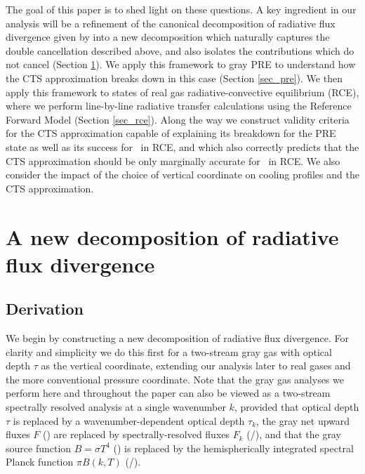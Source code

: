 \documentclass[10pt]{article}
\newcommand{\tauk}{\ensuremath{\tau_k}}
\begin{document}
The goal of this paper is to shed light on these questions.   A key ingredient in our analysis will be a refinement of the canonical decomposition of radiative flux divergence given by \cite{green1967} into a new decomposition which naturally captures the  double cancellation described above, and also isolates the contributions which do not cancel (Section \ref{sec_new_decomp}).  We apply this framework to gray PRE to understand how the CTS approximation breaks down in this case (Section \ref{sec_pre}).  We then apply this framework to states of real gas radiative-convective equilibrium (RCE), where we perform line-by-line radiative transfer calculations using the Reference Forward Model (Section \ref{sec_rce}). Along the way we construct  validity criteria for the CTS approximation capable of explaining its breakdown for the PRE state as well as its success for  \htwo\ in RCE, and which also correctly predicts that the CTS approximation should be only marginally  accurate for \cotwo\ in RCE.  We also consider the impact of the choice of vertical coordinate  on cooling profiles and the CTS approximation. 


\section{A new decomposition of radiative flux divergence} \label{sec_new_decomp}
\subsection{Derivation} \label{sec_derivation}
We begin by constructing a new decomposition of radiative flux divergence. For clarity and simplicity we do this first for a two-stream gray gas with optical depth $\tau$ as the vertical coordinate, extending our analysis later to real gases and the more conventional pressure coordinate. Note that the gray gas analyses we perform here and throughout the paper can also be viewed as a two-stream spectrally resolved analysis at a single wavenumber $k$, provided that optical depth $\tau$ is replaced by a wavenumber-dependent optical depth $\tauk$, the gray net upward fluxes $F$ (\Wmsq)  are replaced by spectrally-resolved fluxes $F_k$ (\Wmsq/\cminverse), and that the gray source function $B=\sigma T^4$ (\Wmsq)  is replaced  by the hemispherically integrated spectral  Planck function $\pi B(k,T)$ (\Wmsq/\cminverse). 
\end{document}
